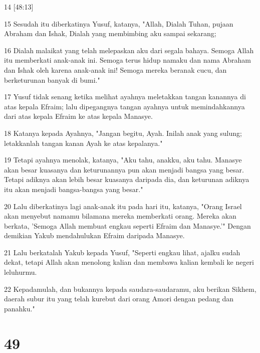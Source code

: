 \par 14 [48:13]
\par 15 Sesudah itu diberkatinya Yusuf, katanya, "Allah, Dialah Tuhan, pujaan Abraham dan Ishak, Dialah yang membimbing aku sampai sekarang;
\par 16 Dialah malaikat yang telah melepaskan aku dari segala bahaya. Semoga Allah itu memberkati anak-anak ini. Semoga terus hidup namaku dan nama Abraham dan Ishak oleh karena anak-anak ini! Semoga mereka beranak cucu, dan berketurunan banyak di bumi."
\par 17 Yusuf tidak senang ketika melihat ayahnya meletakkan tangan kanannya di atas kepala Efraim; lalu dipegangnya tangan ayahnya untuk memindahkannya dari atas kepala Efraim ke atas kepala Manasye.
\par 18 Katanya kepada Ayahnya, "Jangan begitu, Ayah. Inilah anak yang sulung; letakkanlah tangan kanan Ayah ke atas kepalanya."
\par 19 Tetapi ayahnya menolak, katanya, "Aku tahu, anakku, aku tahu. Manasye akan besar kuasanya dan keturunannya pun akan menjadi bangsa yang besar. Tetapi adiknya akan lebih besar kuasanya daripada dia, dan keturunan adiknya itu akan menjadi bangsa-bangsa yang besar."
\par 20 Lalu diberkatinya lagi anak-anak itu pada hari itu, katanya, "Orang Israel akan menyebut namamu bilamana mereka memberkati orang. Mereka akan berkata, 'Semoga Allah membuat engkau seperti Efraim dan Manasye.'" Dengan demikian Yakub mendahulukan Efraim daripada Manasye.
\par 21 Lalu berkatalah Yakub kepada Yusuf, "Seperti engkau lihat, ajalku sudah dekat, tetapi Allah akan menolong kalian dan membawa kalian kembali ke negeri leluhurmu.
\par 22 Kepadamulah, dan bukannya kepada saudara-saudaramu, aku berikan Sikhem, daerah subur itu yang telah kurebut dari orang Amori dengan pedang dan panahku."

\chapter{49}

